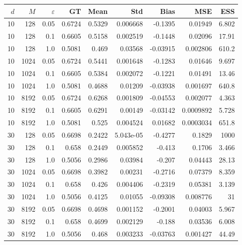 \documentclass{article}
\begin{document}
\begin{table}[htbp]
\centering
\scriptsize
\setlength{\tabcolsep}{4pt}
\begin{tabular}{rrr|rrrrrr}
\toprule
$d$ & $M$ & $\varepsilon$ & GT & Mean & Std & Bias & MSE & ESS \\
\midrule
\rowcolor{yellow!40}10 & 128 & 0.05 & 0.6724 & 0.5329 & 0.006668 & -0.1395 & 0.01949 & 6.802 \\
\rowcolor{yellow!40}10 & 128 & 0.1 & 0.6605 & 0.5158 & 0.002519 & -0.1448 & 0.02096 & 17.91 \\
10 & 128 & 1.0 & 0.5081 & 0.469 & 0.03568 & -0.03915 & 0.002806 & 610.2 \\
\midrule
\rowcolor{yellow!40}10 & 1024 & 0.05 & 0.6724 & 0.5441 & 0.001648 & -0.1283 & 0.01646 & 9.697 \\
\rowcolor{yellow!40}10 & 1024 & 0.1 & 0.6605 & 0.5384 & 0.002072 & -0.1221 & 0.01491 & 13.46 \\
10 & 1024 & 1.0 & 0.5081 & 0.4688 & 0.01209 & -0.03938 & 0.001697 & 640.8 \\
\midrule
10 & 8192 & 0.05 & 0.6724 & 0.6268 & 0.001809 & -0.04553 & 0.002077 & 4.363 \\
10 & 8192 & 0.1 & 0.6605 & 0.6291 & 0.00149 & -0.03142 & 0.0009892 & 5.728 \\
10 & 8192 & 1.0 & 0.5081 & 0.525 & 0.004524 & 0.01682 & 0.0003034 & 651.8 \\
\midrule
\rowcolor{red!40}30 & 128 & 0.05 & 0.6698 & 0.2422 & 5.043e-05 & -0.4277 & 0.1829 & 1000 \\
\rowcolor{red!40}30 & 128 & 0.1 & 0.658 & 0.2449 & 0.005852 & -0.413 & 0.1706 & 3.466 \\
\rowcolor{orange!50}30 & 128 & 1.0 & 0.5056 & 0.2986 & 0.03984 & -0.207 & 0.04443 & 28.13 \\
\midrule
\rowcolor{orange!50}30 & 1024 & 0.05 & 0.6698 & 0.3982 & 0.00231 & -0.2716 & 0.07379 & 8.359 \\
\rowcolor{orange!50}30 & 1024 & 0.1 & 0.658 & 0.426 & 0.004406 & -0.2319 & 0.05381 & 3.139 \\
\rowcolor{yellow!40}30 & 1024 & 1.0 & 0.5056 & 0.4125 & 0.01055 & -0.09308 & 0.008776 & 31 \\
\midrule
\rowcolor{yellow!40}30 & 8192 & 0.05 & 0.6698 & 0.4698 & 0.001152 & -0.2001 & 0.04003 & 5.967 \\
\rowcolor{yellow!40}30 & 8192 & 0.1 & 0.658 & 0.4699 & 0.002129 & -0.188 & 0.03536 & 6.008 \\
30 & 8192 & 1.0 & 0.5056 & 0.468 & 0.003233 & -0.03763 & 0.001427 & 44.49 \\

\end{tabular}
\end{table}
\end{document}
